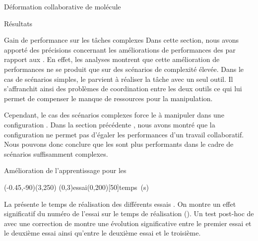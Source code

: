 \documentclass[myfrancais]{mythesis}
\begin{document}
\begin{mychapter}{Déformation collaborative de molécule}
\begin{mysection}{Résultats}
\begin{mysubsection}{Gain de performance sur les tâches complexes}
				Dans cette section, nous avons apporté des précisions concernant les améliorations de performances des  par rapport aux .
				En effet, les analyses montrent que cette amélioration de performances ne se produit que sur des scénarios de complexité élevée.
				Dans le cas de scénarios simples, le  parvient à réaliser la tâche avec un seul outil.
				Il s'affranchit ainsi des problèmes de coordination entre les deux outils ce qui lui permet de compenser le manque de ressources pour la manipulation.

				Cependant, le cas des scénarios complexes force le  à manipuler dans une configuration .
				Dans la section précédente , nous avons montré que la configuration  ne permet pas d'égaler les performances d'un travail collaboratif.
				Nous pouvons donc conclure que les  sont plus performants dans le cadre de scénarios suffisamment complexes.
			\end{mysubsection}
			\begin{mysubsection}{Amélioration de l'apprentissage pour les }
				\begin{myfigure}
					\begin{myps}(-0.45,-90)(3,250)
						\myaxes(0,3){essai}(0,200)[50]{temps~(s)}
					\end{myps}
				\end{myfigure}

				La  présente le temps de réalisation  des différents essais .
				On montre un effet significatif du numéro de l'essai  sur le temps de réalisation  ().
				Un test post-hoc de  avec une correction de  montre une évolution significative entre le premier essai et le deuxième essai ainsi qu'entre le deuxième essai et le troisième.


\end{mysubsection}
\end{mysection}
\end{mychapter}
\end{document}

